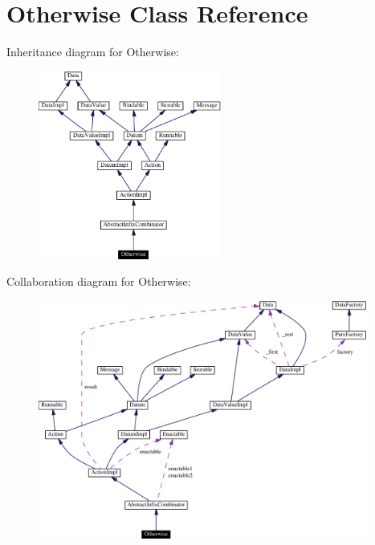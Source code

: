 \hypertarget{classOtherwise}{
\section{Otherwise  Class Reference}
\label{classOtherwise}
}
Inheritance diagram for Otherwise:\begin{figure}[H]
\begin{center}
\leavevmode
\includegraphics[width=170pt]{classOtherwise__inherit__graph}
\end{center}
\end{figure}
Collaboration diagram for Otherwise:\begin{figure}[H]
\begin{center}
\leavevmode
\includegraphics[width=308pt]{classOtherwise__coll__graph}
\end{center}
\end{figure}
